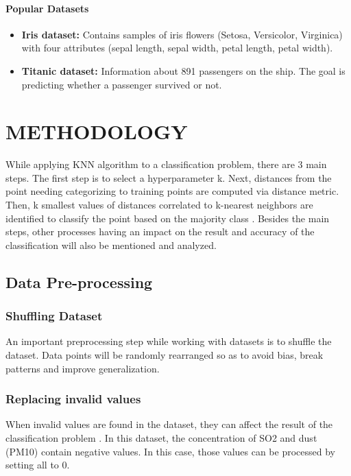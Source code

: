 \documentclass[10pt,twocolumn]{article}
\begin{document}
\paragraph{Popular Datasets}
\begin{itemize}
    \item \textbf{Iris dataset:} Contains samples of iris flowers (Setosa, Versicolor, Virginica) with four attributes (sepal length, sepal width, petal length, petal width).
    \item \textbf{Titanic dataset:} Information about 891 passengers on the ship. The goal is predicting whether a passenger survived or not.
\end{itemize}

\section{METHODOLOGY}

While applying KNN algorithm to a classification problem, there are 3 main steps. The first step is to select a hyperparameter k. Next, distances from the point needing categorizing to training points are computed via distance metric. Then, k smallest values of distances correlated to k-nearest neighbors are identified to classify the point based on the majority class \cite{laviale2023}. Besides the main steps, other processes having an impact on the result and accuracy of the classification will also be mentioned and analyzed.

\subsection{Data Pre-processing}

\subsubsection{Shuffling Dataset}
An important preprocessing step while working with datasets is to shuffle the dataset. Data points will be randomly rearranged so as to avoid bias, break patterns and improve generalization.

\subsubsection{Replacing invalid values}
When invalid values are found in the dataset, they can affect the result of the classification problem \cite{bauermeister2012}. In this dataset, the concentration of SO2 and dust (PM10) contain negative values. In this case, those values can be processed by setting all to 0.
\end{document}

